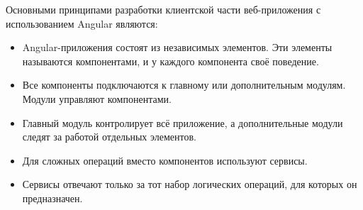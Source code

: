 Основными принципами разработки клиентской части веб-приложения с использованием Angular являются:
\begin{itemize}
	\item Angular-приложения состоят из независимых элементов. Эти элементы называются компонентами, и у каждого компонента своё поведение.
	\item Все компоненты подключаются к главному или дополнительным модулям. Модули управляют компонентами.
	\item Главный модуль контролирует всё приложение, а дополнительные модули следят за работой отдельных элементов.
	\item Для сложных операций вместо компонентов используют сервисы.
	\item Сервисы отвечают только за тот набор логических операций, для которых он предназначен.
\end{itemize}

